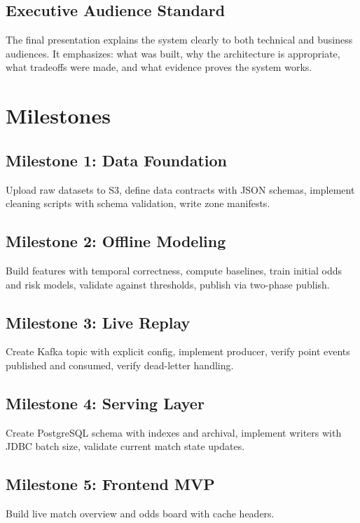 \documentclass[11pt,a4paper]{article}
\begin{document}
\subsection{Executive Audience Standard}

The final presentation explains the system clearly to both technical and business audiences. It
emphasizes: what was built, why the architecture is appropriate, what tradeoffs were made, and
what evidence proves the system works.

\section{Milestones}

\subsection{Milestone 1: Data Foundation}
Upload raw datasets to S3, define data contracts with JSON schemas, implement cleaning scripts
with schema validation, write zone manifests.

\subsection{Milestone 2: Offline Modeling}
Build features with temporal correctness, compute baselines, train initial odds and risk models,
validate against thresholds, publish via two-phase publish.

\subsection{Milestone 3: Live Replay}
Create Kafka topic with explicit config, implement producer, verify point events published and
consumed, verify dead-letter handling.

\subsection{Milestone 4: Serving Layer}
Create PostgreSQL schema with indexes and archival, implement writers with JDBC batch size,
validate current match state updates.

\subsection{Milestone 5: Frontend MVP}
Build live match overview and odds board with cache headers.
\end{document}
